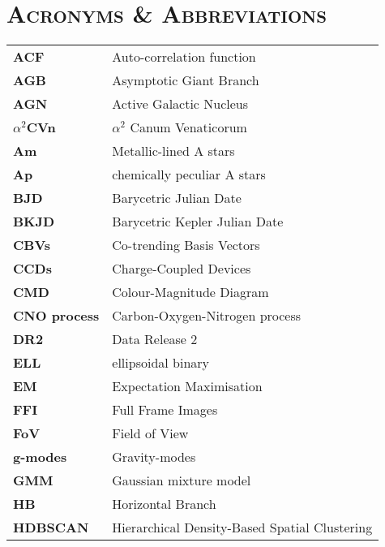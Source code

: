 \chapter*{\textsc{Acronyms \& Abbreviations}}

\vspace{-1cm}
\setlength{\tabcolsep}{25pt}

{%
\begin{longtable}{ll}

\textbf{ACF}				&	Auto-correlation function	\\
\textbf{AGB}				&	Asymptotic Giant Branch	\\
\textbf{AGN}				&	Active Galactic Nucleus	\\
\textbf{$\alpha^2$CVn}		&	$\alpha^2$ Canum Venaticorum	\\
\textbf{Am}					&	Metallic-lined A stars	\\
\textbf{Ap}					&	chemically peculiar A stars	\\
\textbf{BJD}				&	Barycetric Julian Date	\\
\textbf{BKJD}				&	Barycetric Kepler Julian Date	\\
\textbf{CBVs}				&	Co-trending Basis Vectors	\\
\textbf{CCDs}				&	Charge-Coupled Devices	\\
\textbf{CMD}				&	Colour-Magnitude Diagram	\\
\textbf{CNO process}		&	Carbon-Oxygen-Nitrogen process	\\
\textbf{DR2}				&	Data Release 2	\\
\textbf{ELL}				&	ellipsoidal binary	\\
\textbf{EM}					&	Expectation Maximisation	\\
\textbf{FFI}				&	Full Frame Images	\\
\textbf{FoV}				&	Field of View	\\
\textbf{g-modes}			&	Gravity-modes	\\
\textbf{GMM}				&	Gaussian mixture model	\\
\textbf{HB}					&	Horizontal Branch	\\
\textbf{HDBSCAN}			&	Hierarchical Density-Based Spatial Clustering \\

\end{longtable}}
